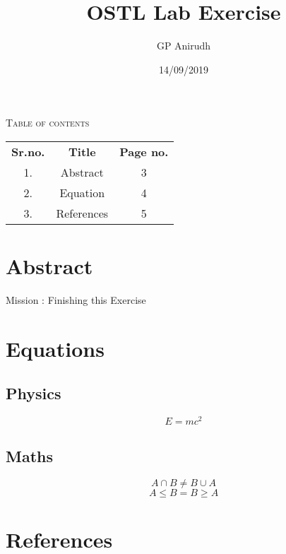 \documentclass[a4paper,12pt]{article}
\begin{document}
	\title{OSTL Lab Exercise}
	\author{GP Anirudh}
	\date{14/09/2019}
	\maketitle
	\newpage
	\textsc{Table of contents}
	\begin{table}[h]
		\begin{tabular}{c c c}
			\textbf{Sr.no.} & \textbf{Title} & \textbf{Page no.}\\
			1. & Abstract & 3\\
			2. & Equation & 4\\
			3. & References & 5\\
		\end{tabular}
	\end{table}
	\newpage
	\section{Abstract}
	  Mission :  Finishing this Exercise
	\newpage
	\section{Equations}
	\subsection{Physics}
	\begin{equation}
	\label{emc}
	E = mc^2
	\end{equation}
	\subsection{Maths}
	\begin{equation}
	\label{set2}
	A \cap B \neq B \cup A
	\end{equation}
	\begin{equation}
	\label{set3}
	A \leq B = B \geq A
	\end{equation}
	\newpage
	
	\section{References}
	\cite{6740844}
	
	
\end{document}
